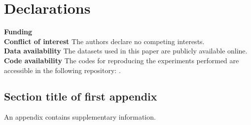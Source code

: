 \documentclass[pdflatex,sn-mathphys-ay]{sn-jnl}%
\theoremstyle{thmstyleone}%
\theoremstyle{thmstyletwo}%
\theoremstyle{thmstylethree}%
\begin{document}
\section*{Declarations}

\noindent \textbf{Funding}\\

\noindent \textbf{Conflict of interest} The authors declare no competing interests.\\

\noindent \textbf{Data availability} The datasets used in this paper are publicly available online.\\

\noindent \textbf{Code availability} The codes for reproducing the experiments performed are accessible in the following repository: \url{}.\\


\begin{appendices}

\section{Section title of first appendix}\label{secA1}

An appendix contains supplementary information.

\end{appendices}

\end{document}
